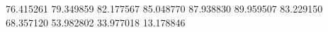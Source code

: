 76.415261
79.349859
82.177567
85.048770
87.938830
89.959507
83.229150
68.357120
53.982802
33.977018
13.178846
